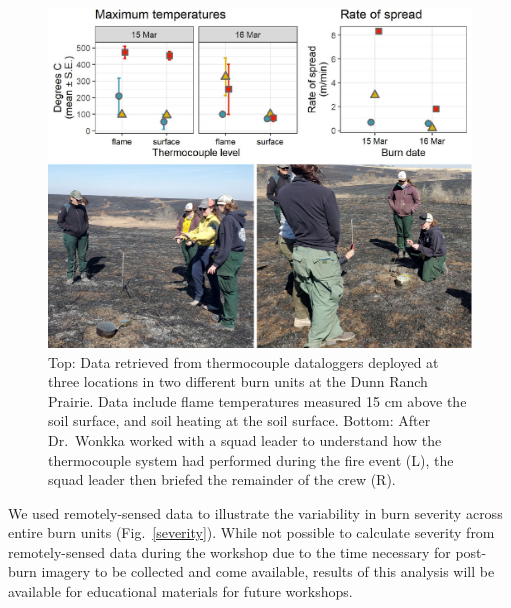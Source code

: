 \documentclass[fire,article,submit,moreauthors,pdftex]{Definitions/mdpi}
\begin{document}
\begin{figure}
\centering
\includegraphics[width=1\columnwidth]{thermocouples.pdf}
\caption{Top: Data retrieved from thermocouple dataloggers deployed at three locations in two different burn units at the Dunn Ranch Prairie. Data include flame temperatures measured 15 cm above the soil surface, and soil heating at the soil surface. Bottom: After Dr.~Wonkka worked with a squad leader to understand how the thermocouple system had performed during the fire event (L), the squad leader then briefed the remainder of the crew (R). \label{thermocouples}}
\end{figure}

We used remotely-sensed data to illustrate the variability in burn severity across entire burn units (Fig.~\ref{severity}).
While not possible to calculate severity from remotely-sensed data during the workshop due to the time necessary for post-burn imagery to be collected and come available, results of this analysis will be available for educational materials for future workshops.
\end{document}

